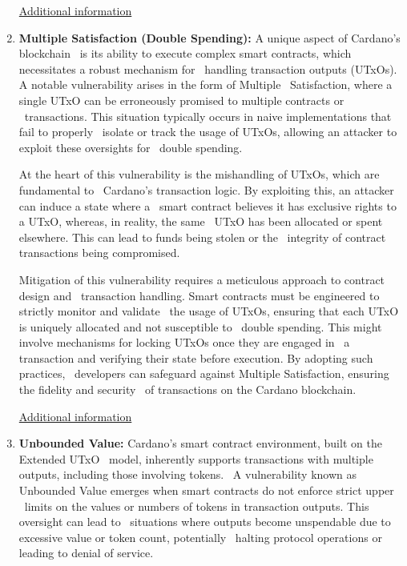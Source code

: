 \documentclass{scrreport}
\begin{document}
\begin{enumerate}
    \href{https://github.com/input-output-hk/Certification-working-group/blob/vuln-from-audits/Cardano%20Threat%20Intelligence/Vulnerabilities/CTI-2023-ADA-11-03.md}{Additional information} 

    \item \textbf{Multiple Satisfaction (Double Spending):} A unique aspect of Cardano's blockchain \
    is its ability to execute complex smart contracts, which necessitates a robust mechanism for \
    handling transaction outputs (UTxOs). A notable vulnerability arises in the form of Multiple \
    Satisfaction, where a single UTxO can be erroneously promised to multiple contracts or \
    transactions. This situation typically occurs in naive implementations that fail to properly \
    isolate or track the usage of UTxOs, allowing an attacker to exploit these oversights for \
    double spending.\

    At the heart of this vulnerability is the mishandling of UTxOs, which are fundamental to \
    Cardano's transaction logic. By exploiting this, an attacker can induce a state where a \
    smart contract believes it has exclusive rights to a UTxO, whereas, in reality, the same \
    UTxO has been allocated or spent elsewhere. This can lead to funds being stolen or the \
    integrity of contract transactions being compromised.\

    Mitigation of this vulnerability requires a meticulous approach to contract design and \
    transaction handling. Smart contracts must be engineered to strictly monitor and validate \
    the usage of UTxOs, ensuring that each UTxO is uniquely allocated and not susceptible to \
    double spending. This might involve mechanisms for locking UTxOs once they are engaged in \
    a transaction and verifying their state before execution. By adopting such practices, \
    developers can safeguard against Multiple Satisfaction, ensuring the fidelity and security \
    of transactions on the Cardano blockchain.\
    
    \href{https://github.com/input-output-hk/Certification-working-group/blob/vuln-from-audits/Cardano%20Threat%20Intelligence/Vulnerabilities/CTI-2023-ADA-11-04.md}{Additional information}
    
    \item \textbf{Unbounded Value:} Cardano's smart contract environment, built on the Extended UTxO \
    model, inherently supports transactions with multiple outputs, including those involving tokens. \
    A vulnerability known as Unbounded Value emerges when smart contracts do not enforce strict upper \
    limits on the values or numbers of tokens in transaction outputs. This oversight can lead to \
    situations where outputs become unspendable due to excessive value or token count, potentially \
    halting protocol operations or leading to denial of service.\
    

\end{enumerate}
\end{document}
